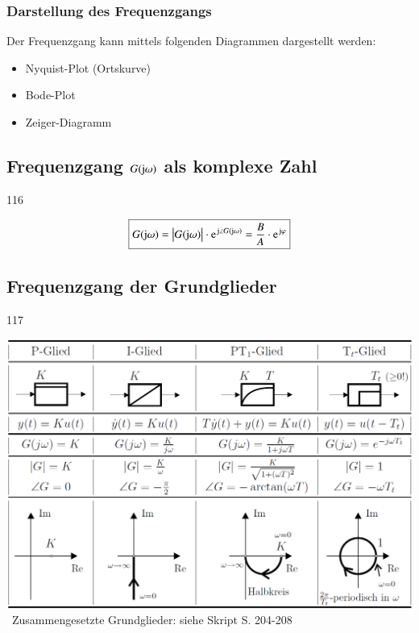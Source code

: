\subsubsection*{Darstellung des Frequenzgangs}

Der Frequenzgang kann mittels folgenden Diagrammen dargestellt werden: 

\begin{itemize}
    \item Nyquist-Plot (Ortskurve)
    \item Bode-Plot
    \item Zeiger-Diagramm
\end{itemize}


\subsection[Frequenzgang G(j omega) als komplexe Zahl]{Frequenzgang $G(\mathrm{j} \omega)$ als komplexe Zahl}{116}

\vspace{-0.3cm} %
$$ \boxed{ G(\jimg \omega) =  \abs{G(\jimg \omega)} \cdot \e^{\jimg \angle G(\jimg \omega)} = \frac{B}{A} \cdot \e^{\jimg  \varphi} } $$


\subsection{Frequenzgang der Grundglieder}{117}

\includegraphics[width=\columnwidth]{images/frequenzgaenge_grundglieder.png} \\
\textrightarrow\ Zusammengesetzte Grundglieder: siehe Skript S. 204-208


